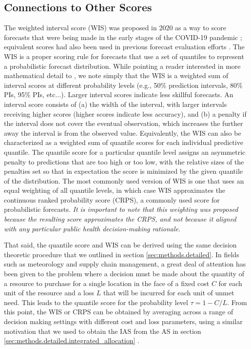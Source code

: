 \documentclass{article}\usepackage[]{graphicx}\usepackage[]{xcolor}
\begin{document}
\subsection{Connections to Other Scores}
\label{sec:methods.related}

The weighted interval score (WIS) was proposed in 2020 as a way to score forecasts that were being made in the early stages of the COVID-19 pandemic \citep{bracher2021evaluating}; equivalent scores had also been used in previous forecast evaluation efforts \cite[e.g.,][]{hong2016probabilisticEnergyForecasting}.
The WIS is a proper scoring rule for forecasts that use a set of quantiles to represent a probabilistic forecast distribution.
While pointing a reader interested in more mathematical detail to \cite{bracher2021evaluating}, we note simply that the WIS is a weighted sum of interval scores at different probability levels (e.g., 50\% prediction intervals, 80\% PIs, 95\% PIs, etc...).
Larger interval scores indicate less skillful forecasts.
An interval score consists of (a) the width of the interval, with larger intervals receiving higher scores (higher scores indicate less accuracy), and (b) a penalty if the interval does not cover the eventual observation, which increases the further away the interval is from the observed value.
Equivalently, the WIS can also be characterized as a weighted sum of quantile scores for each individual predictive quantile.
The quantile score for a particular quantile level assigns an asymmetric penalty to predictions that are too high or too low, with the relative sizes of the penalties set so that in expectation the score is minimized by the given quantile of the distribution.
The most commonly used version of WIS is one that uses an equal weighting of all quantile levels, in which case WIS approximates the continuous ranked probability score (CRPS), a commonly used score for probabilistic forecasts.
\emph{It is important to note that this weighting was proposed because the resulting score approximates the CRPS, and not because it aligned with any particular public health decision-making rationale.}

That said, the quantile score and WIS can be derived using the same decision theoretic procedure that we outlined in section \ref{sec:methods.detailed}.
In fields such as meteorology and supply chain management, a great deal of attention has been given to the problem where a decision must be made about the quantity of a resource to purchase for a single location in the face of a fixed cost $C$ for each unit of the resource and a loss $L$ that will be incurred for each unit of unmet need.
This leads to the quantile score for the probability level $\tau = 1 - C/L$.
From this point, the WIS or CRPS can be obtained by averaging across a range of decision making settings with different cost and loss parameters, using a similar motivation that we used to obtain the IAS from the AS in section \ref{sec:methods.detailed.integrated_allocation} \citep{gneiting2011weightedScoringRules}.
\end{document}
